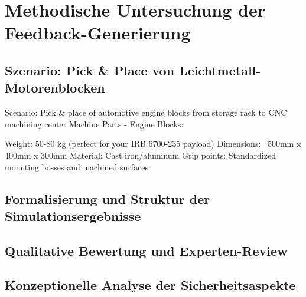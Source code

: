 \chapter{Methodische Untersuchung der Feedback-Generierung}
\label{cap:Untersuchung}

\section{Szenario: Pick \& Place von Leichtmetall-Motorenblocken}
\label{cap:Szeario}
Scenario: Pick \& place of automotive engine blocks from storage rack to CNC machining center
Machine Parts - Engine Blocks:

Weight: 50-80 kg (perfect for your IRB 6700-235 payload)
Dimensions: ~500mm x 400mm x 300mm
Material: Cast iron/aluminum
Grip points: Standardized mounting bosses and machined surfaces
\section{Formalisierung und Struktur der Simulationsergebnisse}
\label{sec:Formalisierung_Ergebnisse}

\section{Qualitative Bewertung und Experten-Review}
\label{sec:Qualitative_Bewertung}

\section{Konzeptionelle Analyse der Sicherheitsaspekte}
\label{sec:Analyse_Sicherheit}
